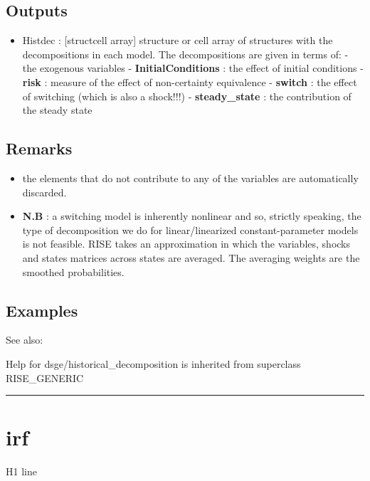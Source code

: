\documentclass[letterpaper,10pt,english]{sphinxmanual}
\begin{document}
\subsection{Outputs}
\label{classes/models/@dsge/dsge:id66}\begin{itemize}
\item {} 
Histdec : {[}struct\textbar{}cell array{]} structure or cell array of structures
with the decompositions in each model. The decompositions are given in
terms of:
- the exogenous variables
- \textbf{InitialConditions} : the effect of initial conditions
- \textbf{risk} : measure of the effect of non-certainty equivalence
- \textbf{switch} : the effect of switching (which is also a shock!!!)
- \textbf{steady\_state} : the contribution of the steady state

\end{itemize}


\subsection{Remarks}
\label{classes/models/@dsge/dsge:remarks}\begin{itemize}
\item {} 
the elements that do not contribute to any of the variables are
automatically discarded.

\item {} 
\textbf{N.B} : a switching model is inherently nonlinear and so, strictly
speaking, the type of decomposition we do for linear/linearized
constant-parameter models is not feasible. RISE takes an approximation
in which the variables, shocks and states matrices across states are
averaged. The averaging weights are the smoothed probabilities.

\end{itemize}


\subsection{Examples}
\label{classes/models/@dsge/dsge:id67}
See also:

Help for dsge/historical\_decomposition is inherited from superclass RISE\_GENERIC


\bigskip\hrule{}\bigskip



\section{irf}
\label{classes/models/@dsge/dsge:id68}\label{classes/models/@dsge/dsge:irf}
H1 line
\end{document}

